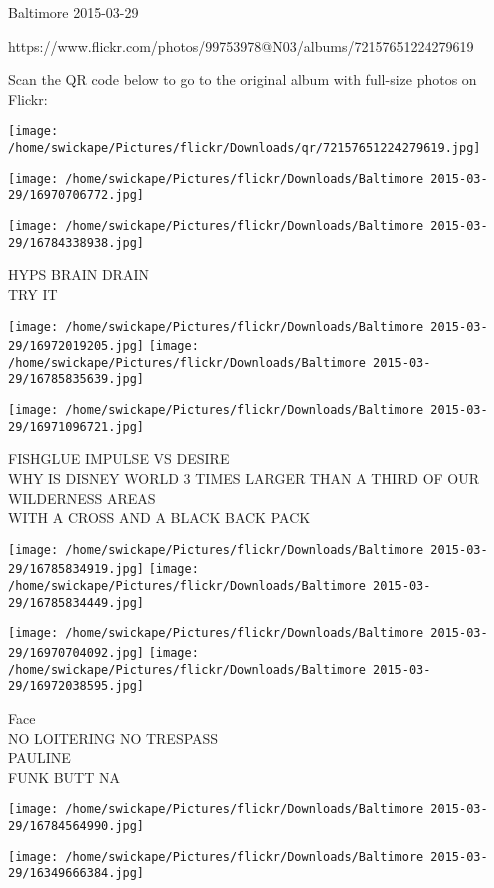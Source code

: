 \documentclass[10pt,letterpaper]{article}
\begin{document}
Baltimore 2015-03-29

https://www.flickr.com/photos/99753978@N03/albums/72157651224279619

Scan the QR code below to go to the original album with full-size photos on Flickr:

\texttt{[image: /home/swickape/Pictures/flickr/Downloads/qr/72157651224279619.jpg]}
\pagebreak

\texttt{[image: /home/swickape/Pictures/flickr/Downloads/Baltimore 2015-03-29/16970706772.jpg]}

\vspace{0.25in}
\texttt{[image: /home/swickape/Pictures/flickr/Downloads/Baltimore 2015-03-29/16784338938.jpg]}

HYPS BRAIN DRAIN\\
TRY IT
\pagebreak

\texttt{[image: /home/swickape/Pictures/flickr/Downloads/Baltimore 2015-03-29/16972019205.jpg]}
\texttt{[image: /home/swickape/Pictures/flickr/Downloads/Baltimore 2015-03-29/16785835639.jpg]}

\vspace{0.25in}
\texttt{[image: /home/swickape/Pictures/flickr/Downloads/Baltimore 2015-03-29/16971096721.jpg]}

FISHGLUE IMPULSE VS DESIRE\\
WHY IS DISNEY WORLD 3 TIMES LARGER THAN A THIRD OF OUR WILDERNESS AREAS\\
WITH A CROSS AND A BLACK BACK PACK
\pagebreak

\texttt{[image: /home/swickape/Pictures/flickr/Downloads/Baltimore 2015-03-29/16785834919.jpg]}
\texttt{[image: /home/swickape/Pictures/flickr/Downloads/Baltimore 2015-03-29/16785834449.jpg]}

\texttt{[image: /home/swickape/Pictures/flickr/Downloads/Baltimore 2015-03-29/16970704092.jpg]}
\texttt{[image: /home/swickape/Pictures/flickr/Downloads/Baltimore 2015-03-29/16972038595.jpg]}

Face\\
NO LOITERING NO TRESPASS\\
PAULINE\\
FUNK BUTT NA
\pagebreak

\texttt{[image: /home/swickape/Pictures/flickr/Downloads/Baltimore 2015-03-29/16784564990.jpg]}

\vspace{0.25in}
\texttt{[image: /home/swickape/Pictures/flickr/Downloads/Baltimore 2015-03-29/16349666384.jpg]}
\end{document}
